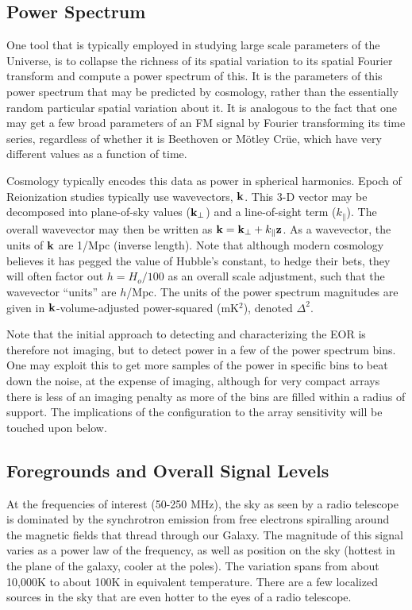 \documentclass[ars]{/Users/daviddeboer1/Documents/Papers/Copernicus_LaTeX_Package_v_2_7/copernicus}
\def\kperp{k_{\bot}}
\def\kpar{k_{\|}}
\def\kperp{k_{\bot}}
\def\kpar{k_{\|}}
\def\k{{\bf k}}
\begin{document}
\subsection{Power Spectrum}
\label{sec:pspec}
One tool that is typically employed in studying large scale parameters of the
Universe, is to collapse the richness of its spatial variation to its spatial Fourier
transform and compute a power spectrum of this. It is the parameters of this power
spectrum that may be predicted by cosmology, rather than the essentially random
particular spatial variation about it. It is analogous to the fact that one may get a few broad
parameters of an FM signal by Fourier transforming its time series, regardless of whether it is
Beethoven or M\"{o}tley Cr\"{u}e, which have very different values as a function of time.

Cosmology typically encodes this data as power in spherical harmonics.  Epoch of
Reionization studies typically use wavevectors, $\k$.  This 3-D vector may be decomposed
into plane-of-sky values (${\bf \kperp}$) and a line-of-sight term (${\kpar}$).  The overall
wavevector may then be written as $\k = {\bf \kperp} + \kpar{\bf z}$.  As a wavevector,
the units of $\k$ are 1/Mpc (inverse length).  Note that although modern cosmology believes
it has pegged the value of Hubble's constant, to hedge their bets, they will often factor out
$h=H_o/100$ as an overall scale adjustment, such that the wavevector ``units'' are $h$/Mpc.  The units
of the power spectrum magnitudes are given in $\k$-volume-adjusted power-squared (mK$^2$), denoted
$\Delta ^2$.

Note that the initial approach to detecting and characterizing the EOR is therefore not imaging, but 
to detect power in a few of the power spectrum bins.  One 
may exploit this to get more samples of the power in specific bins to beat down the noise, at the expense of 
imaging, although for very compact arrays there is less of an imaging penalty as more of the bins
are filled within a radius of support.  The implications of the configuration to the array sensitivity
will be touched upon below.

\subsection{Foregrounds and Overall Signal Levels}
\label{sec:foregrounds}
At the frequencies of interest (50-250 MHz), the sky as seen by a radio telescope is dominated 
by the synchrotron emission from free electrons spiralling around the magnetic fields that thread
through our Galaxy.  The magnitude of this signal varies as a power law of the frequency, as well
as position on the sky (hottest in the plane of the galaxy, cooler at the poles).  The variation spans
from about 10,000K to about 100K in equivalent temperature.  There are a few localized sources
in the sky that are even hotter to the eyes of a radio telescope.
\end{document}
